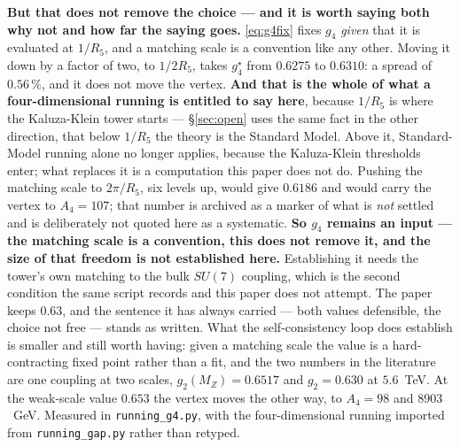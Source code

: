 \documentclass[11pt,a4paper]{article}
\newcommand{\su}[1]{SU(#1)}
\begin{document}
\noindent \textbf{But that does not remove the choice --- and it is worth saying both why not
and how far the saying goes.}
\eqref{eq:g4fix} fixes $g_4$ \emph{given} that it is evaluated at $1/R_5$, and a matching scale
is a convention like any other. Moving it down by a factor of two, to $1/2R_5$, takes $g_4^\star$
from $0.6275$ to $0.6310$: a spread of $0.56\,\%$, and it does not move the vertex.
\textbf{And that is the whole of what a four-dimensional running is entitled to say here}, because
$1/R_5$ is where the Kaluza-Klein tower starts --- \S\ref{sec:open} uses the same fact in the
other direction, that below $1/R_5$ the theory is the Standard Model. Above it, Standard-Model
running alone no longer applies, because the Kaluza-Klein thresholds enter; what replaces it
is a computation this paper does not do. Pushing the matching scale to $2\pi/R_5$,
six levels up, would give $0.6186$ and would carry the vertex to $A_4=107$; that number is archived
as a marker of what is \emph{not} settled and is deliberately not quoted here as a systematic.
\textbf{So $g_4$ remains an input --- the matching scale is a convention, this does not remove it,
and the size of that freedom is not established here.} Establishing it needs the tower's own
matching to the bulk $\su7$ coupling, which is the second condition the same script records and
this paper does not attempt. The paper keeps $0.63$, and the sentence it has always carried --- both
values defensible, the choice not free --- stands as written. What the self-consistency loop does
establish is smaller and still worth having:
given a matching scale the value is a hard-contracting fixed point rather than a fit, and the two
numbers in the literature are one coupling at two scales, $g_2(M_Z)=0.6517$ and $g_2=0.630$ at
$5.6$~TeV. At the weak-scale value $0.653$ the vertex moves the other way, to $A_4=98$ and
$8903$~GeV. Measured in \texttt{running\_\allowbreak g4.py}, with the four-dimensional running
imported from \texttt{running\_\allowbreak gap.py} rather than retyped.
\end{document}
